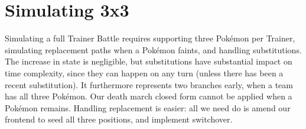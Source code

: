 \section{Simulating 3x3\label{sec:simul3x3}}
Simulating a full Trainer Battle requires supporting three Pokémon per Trainer,
  simulating replacement paths when a Pokémon faints,
  and handling substitutions.
The increase in state is negligible, but substitutions have substantial impact on time complexity,
  since they can happen on any turn (unless there has been a recent substitution).
It furthermore represents two branches early, when a team has all three Pokémon.
Our death march closed form cannot be applied when a Pokémon remains.
Handling replacement is easier: all we need do is amend our frontend to
  seed all three positions, and implement switchover.
